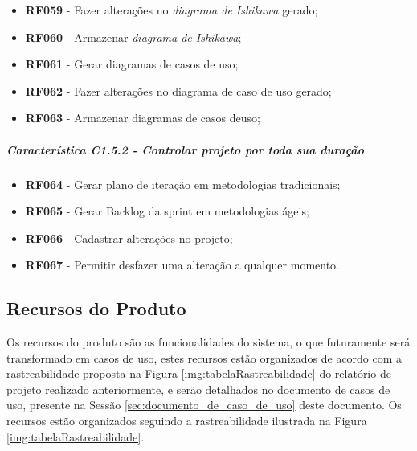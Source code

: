 \begin{enumerate}
\begin{itemize}
				\item \textbf{RF059} - Fazer alterações no \textit{diagrama de Ishikawa} gerado;
				\item \textbf{RF060} - Armazenar \textit{diagrama de Ishikawa};
				\item \textbf{RF061} - Gerar diagramas de casos de uso;
				\item \textbf{RF062} - Fazer alterações no diagrama de caso de uso gerado;
				\item \textbf{RF063} - Armazenar diagramas de casos deuso;
			\end{itemize}
		\subparagraph{Característica C1.5.2 - Controlar projeto por toda sua duração}
			\begin{itemize}
				\item \textbf{RF064} - Gerar plano de iteração em metodologias tradicionais;
				\item \textbf{RF065} - Gerar Backlog da sprint em metodologias ágeis;
				\item \textbf{RF066} - Cadastrar alterações no projeto;
				\item \textbf{RF067} - Permitir desfazer uma alteração a qualquer momento.
			\end{itemize}
	\end{enumerate}

\subsection{Recursos do Produto}
\label{subsub:recursos_produto}

Os recursos do produto são as funcionalidades do sistema, o que futuramente será transformado em casos de uso, estes recursos estão organizados de acordo com a rastreabilidade proposta na Figura \ref{img:tabelaRastreabilidade} do relatório de projeto realizado anteriormente, e serão detalhados no documento de casos de uso, presente na Sessão \ref{sec:documento_de_caso_de_uso} deste documento. Os recursos estão organizados seguindo a rastreabilidade ilustrada na Figura \ref{img:tabelaRastreabilidade}.

